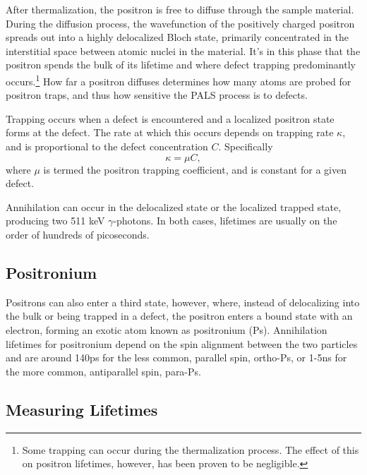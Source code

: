 After thermalization, the positron is free to diffuse through the sample material. During the diffusion process, the wavefunction of the positively charged positron spreads out into a highly delocalized Bloch state, primarily concentrated in the interstitial space between atomic nuclei in the material. It's in this phase that the positron spends the bulk of its lifetime and where defect trapping predominantly occurs.\footnote{Some trapping can occur during the thermalization process. The effect of this on positron lifetimes, however, has been proven to be negligible.} How far a positron diffuses determines how many atoms are probed for positron traps, and thus how sensitive the PALS process is to defects.

Trapping occurs when a defect is encountered and a localized positron state forms at the defect. The rate at which this occurs depends on trapping rate $\kappa$, and is proportional to the defect concentration $C$. Specifically
\begin{equation}
    \kappa = \mu C,
    \label{eq:traprate}
\end{equation}
where $\mu$ is termed the positron trapping coefficient, and is constant for a given defect.

Annihilation can occur in the delocalized state or the localized trapped state, producing two 511 keV $\gamma$-photons. In both cases, lifetimes are usually on the order of hundreds of picoseconds.

\subsection{Positronium}

Positrons can also enter a third state, however, where, instead of delocalizing into the bulk or being trapped in a defect, the positron enters a bound state with an electron, forming an exotic atom known as positronium (Ps). Annihilation lifetimes for positronium depend on the spin alignment between the two particles and are around 140ps for the less common, parallel spin, ortho-Ps, or 1-5ns for the more common, antiparallel spin, para-Ps.

\subsection{Measuring Lifetimes}

